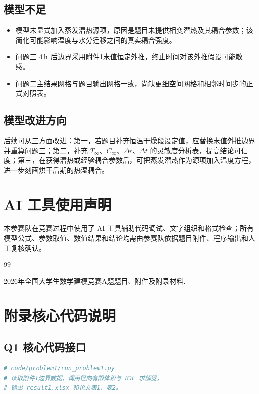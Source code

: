 \documentclass[UTF8,a4paper,12pt]{ctexart}
\numberwithin{equation}{section}
\begin{document}
\subsection{模型不足}
\begin{itemize}[leftmargin=2em]
  \item 模型未显式加入蒸发潜热源项，原因是题目未提供相变潜热及其耦合参数；该简化可能影响温度与水分迁移之间的真实耦合强度。
  \item 问题三 $4\rm\,h$ 后边界采用附件1末值恒定外推，终止时间对该外推假设可能敏感。
  \item 问题二主结果网格与题目输出网格一致，尚缺更细空间网格和相邻时间步的正式对照表。
\end{itemize}

\subsection{模型改进方向}
后续可从三方面改进：第一，若题目补充恒温干燥段设定值，应替换末值外推边界并重算问题三；第二，补充 $T_\infty$、$C_\infty$、$\Delta r$、$\Delta t$ 的灵敏度分析表，提高结论可信度；第三，在获得潜热或经验耦合参数后，可把蒸发潜热作为源项加入温度方程，进一步刻画烘干后期的热湿耦合。

\clearpage
\section*{AI 工具使用声明}
本参赛队在竞赛过程中使用了 AI 工具辅助代码调试、文字组织和格式检查；所有模型公式、参数取值、数值结果和结论均需由参赛队依据题目附件、程序输出和人工复核确认。

\clearpage
\begin{thebibliography}{99}
 2026年全国大学生数学建模竞赛A题题目、附件及附录材料.
\end{thebibliography}

\clearpage
\appendix
\section{附录核心代码说明}
\subsection{Q1 核心代码接口}
\begin{lstlisting}[language=Python,caption={问题一求解主流程接口}]
# code/problem1/run_problem1.py
# 读取附件1边界数据，调用径向有限体积与 BDF 求解器，
# 输出 result1.xlsx 和论文表1、表2。
\end{lstlisting}
\end{document}
